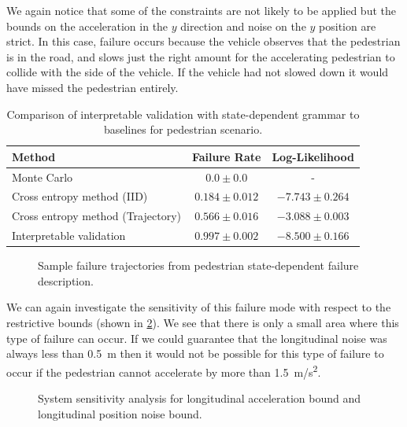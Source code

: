 We again notice that some of the constraints are not likely to be applied but the bounds on the acceleration in the $y$ direction and noise on the $y$ position are strict. In this case, failure occurs because the vehicle observes that the pedestrian is in the road, and slows just the right amount for the accelerating pedestrian to collide with the side of the vehicle. If the vehicle had not slowed down it would have missed the pedestrian entirely.
\begin{table}
    \centering
    \caption{Comparison of interpretable validation with state-dependent grammar to baselines for pedestrian scenario.}
    \label{tab:ped_results_state_dependent}
    \begin{tabular}{@{}lcc@{}} 
        \toprule
        \textbf{Method} & \textbf{Failure Rate} & \textbf{Log-Likelihood} \\
        \midrule
        Monte Carlo & $0.0 \pm 0.0$ &  -   \\
        Cross entropy method (IID) & $0.184 \pm 0.012$ & $-7.743 \pm 0.264$\\
        Cross entropy method (Trajectory) & $0.566 \pm 0.016$ & $-3.088 \pm 0.003$ \\
        Interpretable validation & $0.997 \pm 0.002$ & $-8.500 \pm 0.166$ \\
        \bottomrule
    \end{tabular}
\end{table}

\begin{figure}
    
    \caption{Sample failure trajectories from pedestrian state-dependent failure description.}
    \label{fig:ped_state_dep_sample_failures}
\end{figure}

We can again investigate the sensitivity of this failure mode with respect to the restrictive bounds (shown in \cref{fig:ped_state_sensititivty}). We see that there is only a small area where this type of failure can occur. If we could guarantee that the longitudinal noise was always less than \SI{0.5}{m} then it would not be possible for this type of failure to occur if the pedestrian cannot accelerate by more than \SI{1.5}{m/s^2}. 

\begin{figure}
    \centering
    
    \caption{System sensitivity analysis for longitudinal acceleration bound and longitudinal position noise bound.}
    \label{fig:ped_state_sensititivty}
\end{figure}

